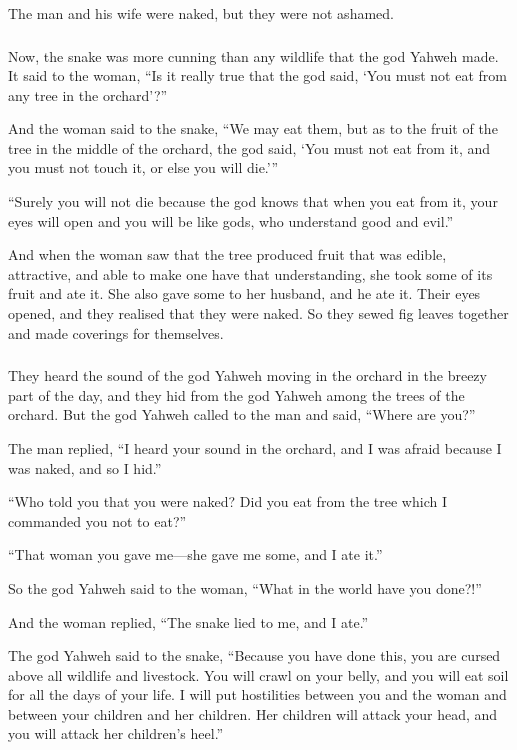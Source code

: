 The man and his wife were naked, but they were not ashamed.

\subsubsection*{\secsep}

Now, the snake was more cunning than any wildlife that the god Yahweh made. 
It said to the woman, 
\enquote{Is it really true that the god said, 
    \enquote{You must not eat from any tree in the orchard}?}

And the woman said to the snake, 
\enquote{We may eat them, but as to the fruit of the tree in the middle of the orchard, 
the god said, \enquote{You must not eat from it, and you must not touch it, 
or else you will die.}}

\enquote{Surely you will not die because the god knows that when you eat from it, 
your eyes will open and you will be like gods, 
who understand good and evil.}

And when the woman saw that the tree produced fruit that 
was edible, attractive, and able to make one have that understanding, 
she took some of its fruit and ate it. 
She also gave some to her husband, and he ate it. 
Their eyes opened, and they realised that they were naked. 
So they sewed fig leaves together and made coverings for themselves.


\subsubsection*{\secsep} 
They heard the sound of the god Yahweh moving in the orchard 
in the breezy part of the day, 
and they hid from the god Yahweh among the trees of the orchard. 
But the god Yahweh called to the man and said, \enquote{Where are you?}

The man replied, 
\enquote{I heard your sound in the orchard, 
and I was afraid because I was naked, 
and so I hid.}

\enquote{Who told you that you were naked? 
Did you eat from the tree which I commanded you not to eat?}

\enquote{That woman you gave me---she gave me some, and I ate it.}

So the god Yahweh said to the woman, \enquote{What in the world have you done?!}

And the woman replied, \enquote{The snake lied to me, and I ate.}

The god Yahweh said to the snake, 
\enquote{Because you have done this, 
you are cursed above all wildlife and livestock.
You will crawl on your belly, 
and you will eat soil 
for all the days of your life. 
I will put hostilities between you and the woman 
and between your children and her children. 
Her children will attack your head, 
and you will attack her children's heel.} 

